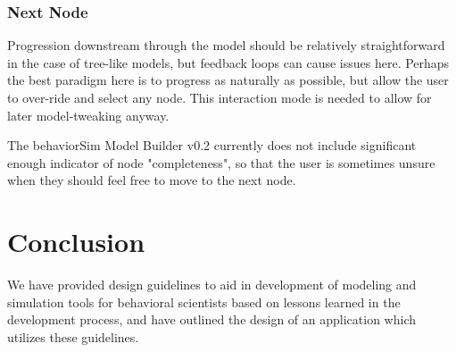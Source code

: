\documentclass[conference]{IEEEtran}
\begin{document}
\subsubsection{Next Node}
Progression downstream through the model should be relatively straightforward in the case of tree-like models, but feedback loops can cause issues here. 
Perhaps the best paradigm here is to progress as naturally as possible, but allow the user to over-ride and select any node. 
This interaction mode is needed to allow for later model-tweaking anyway. 

The behaviorSim Model Builder v0.2 currently does not include significant enough indicator of node "completeness", so that the user is sometimes unsure when they should feel free to move to the next node.




\section{Conclusion}
We have provided design guidelines to aid in development of modeling and simulation tools for behavioral scientists based on lessons learned in the development process, and have outlined the design of an application which utilizes these guidelines.



%
%

\end{document}
